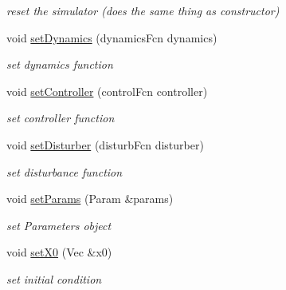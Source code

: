 \begin{DoxyCompactItemize}
\begin{DoxyCompactList}\small\item\em reset the simulator (does the same thing as constructor) \end{DoxyCompactList}\item 
\mbox{\label{classSimulator_af19085bb19ced728593aa27835f6e591}} 
void \mbox{\hyperlink{classSimulator_af19085bb19ced728593aa27835f6e591}{set\+Dynamics}} (dynamics\+Fcn dynamics)
\begin{DoxyCompactList}\small\item\em set dynamics function \end{DoxyCompactList}\item 
\mbox{\label{classSimulator_a53e30a07431c73a9be87657f0eb1b0b4}} 
void \mbox{\hyperlink{classSimulator_a53e30a07431c73a9be87657f0eb1b0b4}{set\+Controller}} (control\+Fcn controller)
\begin{DoxyCompactList}\small\item\em set controller function \end{DoxyCompactList}\item 
\mbox{\label{classSimulator_a77650bca5cc7fd8e71207453339f55a5}} 
void \mbox{\hyperlink{classSimulator_a77650bca5cc7fd8e71207453339f55a5}{set\+Disturber}} (disturb\+Fcn disturber)
\begin{DoxyCompactList}\small\item\em set disturbance function \end{DoxyCompactList}\item 
\mbox{\label{classSimulator_ae102bdd856d7fc496c2b65d42ed82971}} 
void \mbox{\hyperlink{classSimulator_ae102bdd856d7fc496c2b65d42ed82971}{set\+Params}} (Param \&params)
\begin{DoxyCompactList}\small\item\em set Parameters object \end{DoxyCompactList}\item 
\mbox{\label{classSimulator_a9ec70f210a178cfacea6e57736df1229}} 
void \mbox{\hyperlink{classSimulator_a9ec70f210a178cfacea6e57736df1229}{set\+X0}} (Vec \&x0)
\begin{DoxyCompactList}\small\item\em set initial condition \end{DoxyCompactList}\item 

\end{DoxyCompactItemize}
